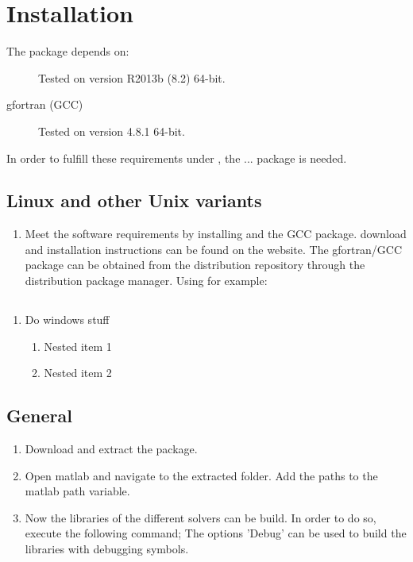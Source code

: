 \chapter[Installation]{Installation}
The \PPODESUITE package depends on:
\begin{description}
  \item[\MATLAB] Tested on \MATLAB version R2013b (8.2) 64-bit.
  \item[gfortran (GCC)] Tested on version 4.8.1 64-bit.
\end{description}
In order to fulfill these requirements under \MSDOS, the ... package is needed.

\section[\nix]{Linux and other Unix variants}
\begin{enumerate}
 \item Meet the software requirements by installing \MATLAB and the GCC package. \MATLAB download and installation instructions can be found on the \MATHWORKS website. The gfortran/GCC package can be obtained from the \nix distribution repository through the distribution package manager. Using \UBUNTU for example:
\end{enumerate}

\section[Windows]{\MSDOS}
\begin{enumerate}
 \item Do windows stuff
 \begin{enumerate}
  \item Nested item 1
  \item Nested item 2
 \end{enumerate}
\end{enumerate}

\section{General}
\begin{enumerate}[resume]
 \item Download and extract the \PPODESUITE package.
 \item Open matlab and navigate to the extracted \PPODESUITE folder. Add the \PPODE paths to the matlab path variable.
 \item Now the libraries of the different solvers can be build. In order to do so, execute the following command;
 The options 'Debug' can be used to build the libraries with debugging symbols.
\end{enumerate}
